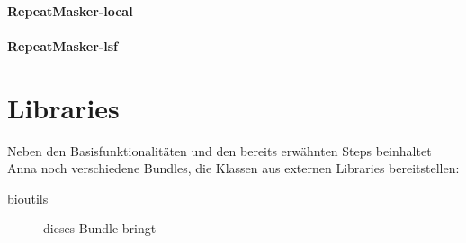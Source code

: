 \paragraph{RepeatMasker-local}

\paragraph{RepeatMasker-lsf}

\section{Libraries}
Neben den Basisfunktionalitäten und den bereits erwähnten Steps
beinhaltet Anna noch verschiedene Bundles, die Klassen aus externen Libraries
bereitstellen:
\begin{description}
\item[bioutils] dieses Bundle bringt 
\end{description}
